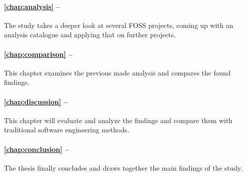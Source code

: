 \paragraph{\autoref{chap:analysis} -- }

The study takes a deeper look at several \ac{FOSS} projects, coming up with an
analysis catalogue and applying that on further projects.

\paragraph{\autoref{chap:comparison} -- }

This chapter examines the previous made analysis and compares the found findings.

\paragraph{\autoref{chap:discussion} -- }

This chapter will evaluate and analyze the findings and compare them with
traditional software engineering methods.

\paragraph{\autoref{chap:conclusion} -- }

The thesis finally concludes and draws together the main findings of the study.


